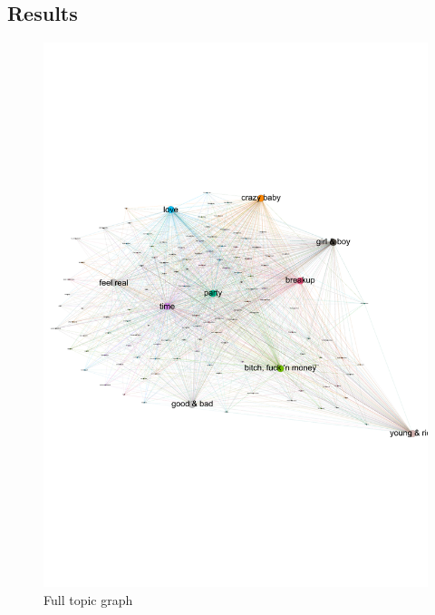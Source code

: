 \documentclass[10pt,a4paper]{article}
\begin{document}
		\subsection{Results}
		
		\begin{figure}[htb]
			\centering
			\includegraphics[trim=0mm 70mm 0mm 50mm, clip, width=\linewidth]{data/topic_graph}
			\caption{Full topic graph}
			\label{fig:topicgraph}
		\end{figure}
		
\end{document}
